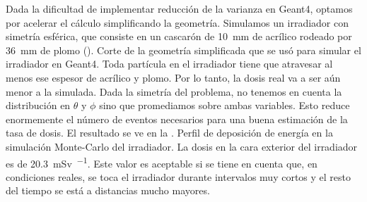 Dada la dificultad de implementar reducción de la varianza en Geant4,
optamos por acelerar el cálculo simplificando la geometría.
Simulamos un irradiador con simetría esférica,
que consiste en un cascarón de \SI{10}{\milli\meter} de acrílico rodeado por
\SI{36}{\milli\meter} de plomo (). 
{Corte de la geometría simplificada que se usó para simular el irradiador en
Geant4.}
Toda partícula en el irradiador tiene que atravesar al menos ese espesor de
acrílico y plomo.
Por lo tanto, la dosis real va a ser aún menor a la simulada.
Dada la simetría del problema, no tenemos en cuenta la distribución en
$\theta$ y $\phi$ sino que promediamos sobre ambas variables.
Esto reduce enormemente el número de eventos necesarios para una buena
estimación de la tasa de dosis.
El resultado se ve en la .
{Perfil de deposición de energía en la simulación Monte-Carlo del irradiador.}
La dosis en la cara exterior del irradiador es
de \SI{20.3}{\milli\sievert\per\year}.
Este valor es aceptable si se tiene en cuenta que,
en condiciones reales, se toca el irradiador durante intervalos muy cortos
y el resto del tiempo se está a distancias mucho mayores.
